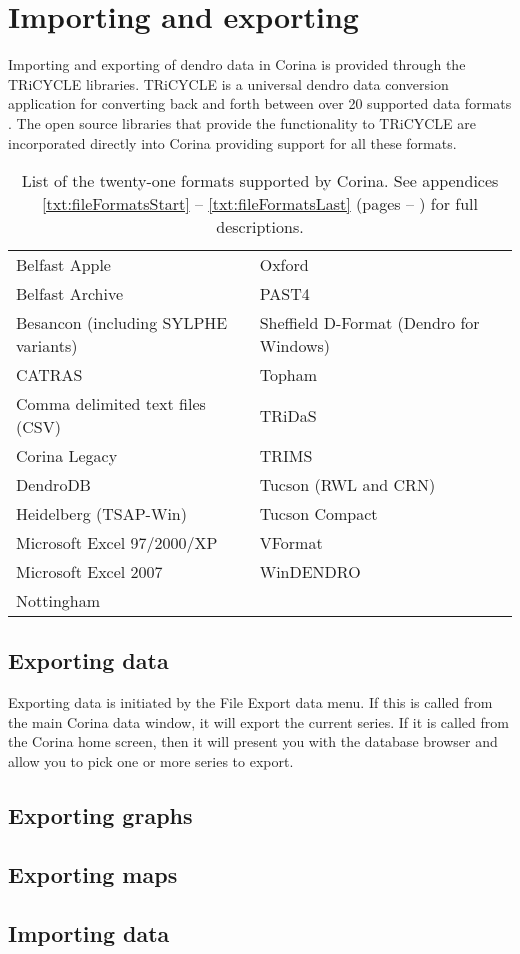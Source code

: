 \chapter{Importing and exporting}

Importing and exporting of dendro data in Corina is provided through the TRiCYCLE libraries.  TRiCYCLE is a universal dendro data conversion application for converting back and forth between over 20 supported data formats \citep{tricycle}.  The open source libraries that provide the functionality to TRiCYCLE are incorporated directly into Corina providing support for all these formats.  

\begin{table*}[htbp]
\centering
\label{txt:formatList}
\begin{tabular*}{0.8\textwidth}{ll}
\toprule
Belfast Apple & Oxford \\
Belfast Archive & PAST4\\
Besancon (including SYLPHE variants) &  Sheffield D-Format (Dendro for Windows)\\
CATRAS & Topham \\
Comma delimited text files (CSV) &  TRiDaS\\
Corina Legacy &  TRIMS\\
DendroDB & Tucson (RWL and CRN)\\
Heidelberg (TSAP-Win) &  Tucson Compact\\
Microsoft Excel 97/2000/XP&  VFormat\\
Microsoft Excel 2007 & WinDENDRO\\
Nottingham &  \\
\bottomrule
\end{tabular*}
\caption{List of the twenty-one formats supported by Corina. See appendices \ref{txt:fileFormatsStart} -- \ref{txt:fileFormatsLast} (pages \pageref{txt:fileFormatsStart} -- \pageref{txt:fileFormatsEnd}) for full descriptions.}
\end{table*}



\section{Exporting data}
Exporting data is initiated by the File \MVRightarrow Export data menu.  If this is called from the main Corina data window, it will export the current series.  If it is called from the Corina home screen, then it will present you with the database browser and allow you to pick one or more series to export.


\section{Exporting graphs}



\section{Exporting maps}


\section{Importing data}
